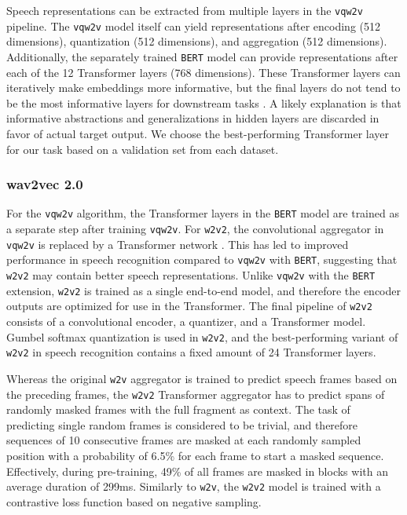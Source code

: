 \documentclass[11pt,a4paper]{article}
\begin{document}
Speech representations can be extracted from multiple layers in the \texttt{vqw2v} pipeline.
The \texttt{vqw2v} model itself can yield representations after encoding (512 dimensions), quantization (512 dimensions), and aggregation (512 dimensions).
Additionally, the separately trained \texttt{BERT} model can provide representations after each of the 12 Transformer layers (768 dimensions).
These Transformer layers can iteratively make embeddings more informative, but the final layers do not tend to be the most informative layers for downstream tasks \citep{tenneyBERTRediscoversClassical2019, devriesWhatSpecialBERT2020}.
A likely explanation is that informative abstractions and generalizations in hidden layers are discarded in favor of actual target output.
We choose the best-performing Transformer layer for our task based on a validation set from each dataset.

\subsubsection{wav2vec 2.0}
For the \texttt{vqw2v} algorithm, the Transformer layers in the \texttt{BERT} model are trained as a separate step after training \texttt{vqw2v}.
For \texttt{w2v2}, the convolutional aggregator in \texttt{vqw2v} is replaced by a Transformer network \citep{baevski2020wav2vec}.
This has led to improved performance in speech recognition compared to \texttt{vqw2v} with \texttt{BERT}, suggesting that \texttt{w2v2} may contain better speech representations.
Unlike \texttt{vqw2v} with the \texttt{BERT} extension, \texttt{w2v2} is trained as a single end-to-end model, and therefore the encoder outputs are optimized for use in the Transformer.
The final pipeline of \texttt{w2v2} consists of a convolutional encoder, a quantizer, and a Transformer model.
Gumbel softmax quantization is used in \texttt{w2v2}, and the best-performing variant of \texttt{w2v2} in speech recognition contains a fixed amount of 24 Transformer layers.  

Whereas the original \texttt{w2v} aggregator is trained to predict speech frames based on the preceding frames, the \texttt{w2v2} Transformer aggregator has to predict spans of randomly masked frames with the full fragment as context.
The task of predicting single random frames is considered to be trivial, and therefore sequences of 10 consecutive frames are masked at each randomly sampled position with a probability of 6.5\% for each frame to start a masked sequence.
Effectively, during pre-training, 49\% of all frames are masked in blocks with an average duration of 299ms.
Similarly to \texttt{w2v}, the \texttt{w2v2} model is trained with a contrastive loss function based on negative sampling.
\end{document}
